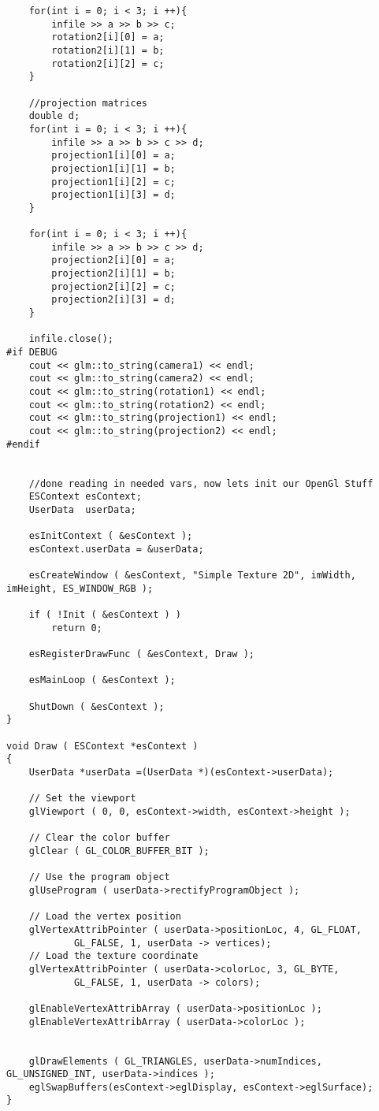 \begin{verbatim}
	for(int i = 0; i < 3; i ++){
		infile >> a >> b >> c;
		rotation2[i][0] = a;
		rotation2[i][1] = b;
		rotation2[i][2] = c;
	}

	//projection matrices
	double d;
	for(int i = 0; i < 3; i ++){
		infile >> a >> b >> c >> d;
		projection1[i][0] = a;
		projection1[i][1] = b;
		projection1[i][2] = c;
		projection1[i][3] = d;
	}

	for(int i = 0; i < 3; i ++){
		infile >> a >> b >> c >> d;
		projection2[i][0] = a;
		projection2[i][1] = b;
		projection2[i][2] = c;
		projection2[i][3] = d;
	}

	infile.close();
#if DEBUG
	cout << glm::to_string(camera1) << endl;
	cout << glm::to_string(camera2) << endl;
	cout << glm::to_string(rotation1) << endl;
	cout << glm::to_string(rotation2) << endl;
	cout << glm::to_string(projection1) << endl;
	cout << glm::to_string(projection2) << endl;
#endif


	//done reading in needed vars, now lets init our OpenGl Stuff
	ESContext esContext;
	UserData  userData;

	esInitContext ( &esContext );
	esContext.userData = &userData;

	esCreateWindow ( &esContext, "Simple Texture 2D", imWidth, imHeight, ES_WINDOW_RGB );

	if ( !Init ( &esContext ) )
		return 0;

	esRegisterDrawFunc ( &esContext, Draw );

	esMainLoop ( &esContext );

	ShutDown ( &esContext );
}

void Draw ( ESContext *esContext )
{
	UserData *userData =(UserData *)(esContext->userData);

	// Set the viewport
	glViewport ( 0, 0, esContext->width, esContext->height );

	// Clear the color buffer
	glClear ( GL_COLOR_BUFFER_BIT );

	// Use the program object
	glUseProgram ( userData->rectifyProgramObject );

	// Load the vertex position
	glVertexAttribPointer ( userData->positionLoc, 4, GL_FLOAT,
			GL_FALSE, 1, userData -> vertices);
	// Load the texture coordinate
	glVertexAttribPointer ( userData->colorLoc, 3, GL_BYTE,
			GL_FALSE, 1, userData -> colors);

	glEnableVertexAttribArray ( userData->positionLoc );
	glEnableVertexAttribArray ( userData->colorLoc );


	glDrawElements ( GL_TRIANGLES, userData->numIndices, GL_UNSIGNED_INT, userData->indices );
	eglSwapBuffers(esContext->eglDisplay, esContext->eglSurface);
}


\end{verbatim}
